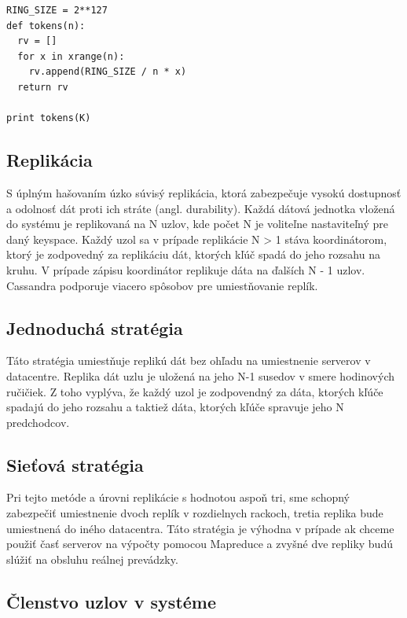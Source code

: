 \documentclass[11pt,twoside,a4paper]{book}
\begin{document}
\begin{verbatim}
RING_SIZE = 2**127
def tokens(n):
  rv = []
  for x in xrange(n):
    rv.append(RING_SIZE / n * x)
  return rv

print tokens(K)
\end{verbatim}




\subsection{Replikácia}

S úplným hašovaním úzko súvisý replikácia, ktorá zabezpečuje vysokú dostupnosť a odolnosť dát proti ich stráte (angl. durability). Každá dátová jednotka vložená do systému je replikovaná na N uzlov, kde počet N je voliteľne nastaviteľný pre daný keyspace. Každý uzol sa v prípade replikácie N > 1 stáva koordinátorom, ktorý je zodpovedný za replikáciu dát, ktorých kľúč spadá do jeho rozsahu na kruhu. V prípade zápisu koordinátor replikuje dáta na ďalších N - 1 uzlov. Cassandra podporuje viacero spôsobov pre umiestňovanie replík.

\subsection*{Jednoduchá stratégia}

Táto stratégia umiestňuje replikú dát bez ohľadu na umiestnenie serverov v datacentre. Replika dát uzlu je uložená na jeho N-1 susedov v smere hodinových ručičiek. Z toho vyplýva, že každý uzol je zodpovendný za dáta, ktorých kľúče spadajú do jeho rozsahu a taktiež dáta, ktorých kľúče spravuje jeho N predchodcov.

\subsection*{Sieťová stratégia}

Pri tejto metóde a úrovni replikácie s hodnotou aspoň tri, sme schopný zabezpečiť umiestnenie dvoch replík v rozdielnych rackoch, tretia replika bude umiestnená do iného datacentra. Táto stratégia je výhodna v prípade ak chceme použiť časť serverov na výpočty pomocou Mapreduce a zvyšné dve repliky budú slúžiť na obsluhu reálnej prevádzky.

\subsection{Členstvo uzlov v systéme}
\end{document}
